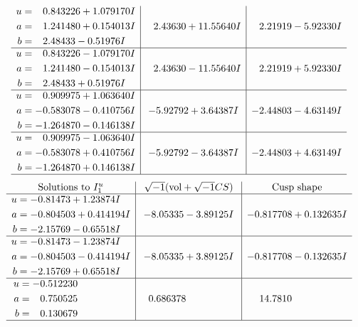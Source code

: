 \documentclass[1p]{elsarticle_modified}
\theoremstyle{definition}
\newcommand{\I}{\sqrt{-1}}
\begin{document}
$$\begin{array}{c|c|c}
\begin{aligned}
u &= \phantom{-}0.843226 + 1.079170 I \\
a &= \phantom{-}1.241480 + 0.154013 I \\
b &= \phantom{-}2.48433 - 0.51976 I\end{aligned}
 & \phantom{-}2.43630 + 11.55640 I & \phantom{-}2.21919 - 5.92330 I \\ \hline\begin{aligned}
u &= \phantom{-}0.843226 - 1.079170 I \\
a &= \phantom{-}1.241480 - 0.154013 I \\
b &= \phantom{-}2.48433 + 0.51976 I\end{aligned}
 & \phantom{-}2.43630 - 11.55640 I & \phantom{-}2.21919 + 5.92330 I \\ \hline\begin{aligned}
u &= \phantom{-}0.909975 + 1.063640 I \\
a &= -0.583078 - 0.410756 I \\
b &= -1.264870 - 0.146138 I\end{aligned}
 & -5.92792 + 3.64387 I & -2.44803 - 4.63149 I \\ \hline\begin{aligned}
u &= \phantom{-}0.909975 - 1.063640 I \\
a &= -0.583078 + 0.410756 I \\
b &= -1.264870 + 0.146138 I\end{aligned}
 & -5.92792 - 3.64387 I & -2.44803 + 4.63149 I\\
 \hline 
 \end{array}$$\newpage$$\begin{array}{c|c|c}  
\text{Solutions to }I^u_{1}& \I (\text{vol} + \sqrt{-1}CS) & \text{Cusp shape}\\
 \hline 
\begin{aligned}
u &= -0.81473 + 1.23874 I \\
a &= -0.804503 + 0.414194 I \\
b &= -2.15769 - 0.65518 I\end{aligned}
 & -8.05335 - 3.89125 I & -0.817708 + 0.132635 I \\ \hline\begin{aligned}
u &= -0.81473 - 1.23874 I \\
a &= -0.804503 - 0.414194 I \\
b &= -2.15769 + 0.65518 I\end{aligned}
 & -8.05335 + 3.89125 I & -0.817708 - 0.132635 I \\ \hline\begin{aligned}
u &= -0.512230\phantom{ +0.000000I} \\
a &= \phantom{-}0.750525\phantom{ +0.000000I} \\
b &= \phantom{-}0.130679\phantom{ +0.000000I}\end{aligned}
 & \phantom{-}0.686378\phantom{ +0.000000I} & \phantom{-}14.7810\phantom{ +0.000000I}\\
 \hline 
 \end{array}$$\newpage\newpage\renewcommand{\arraystretch}{1}
\end{document}
